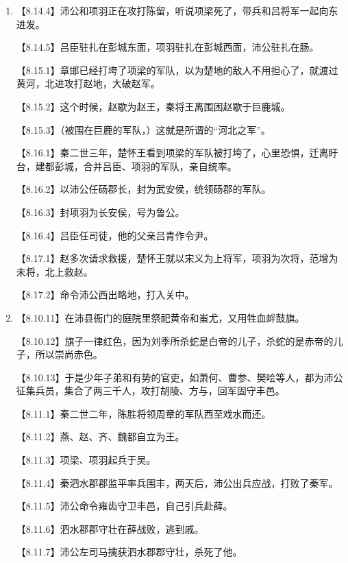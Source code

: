 \documentclass[fontset=none,11pt,a4paper]{ctexart}
\begin{document}
\begin{enumerate}[label=\Alph*.]
  \item
\noindent 【8.14.4】沛公和项羽正在攻打陈留，听说项梁死了，带兵和吕将军一起向东进发。\par
\noindent 【8.14.5】吕臣驻扎在彭城东面，项羽驻扎在彭城西面，沛公驻扎在肠。\par
\noindent 【8.15.1】章邯已经打垮了项梁的军队，以为楚地的敌人不用担心了，就渡过黄河，北进攻打赵地，大破赵军。\par
\noindent 【8.15.2】这个时候，赵歇为赵王，秦将王离围困赵歇于巨鹿城。\par
\noindent 【8.15.3】（被围在巨鹿的军队，）这就是所谓的“河北之军”。\par
\noindent 【8.16.1】秦二世三年，楚怀王看到项梁的军队被打垮了，心里恐惧，迁离盱台，建都彭城，合并吕臣、项羽的军队，亲自统率。\par
\noindent 【8.16.2】以沛公任砀郡长，封为武安侯，统领砀郡的军队。\par
\noindent 【8.16.3】封项羽为长安侯，号为鲁公。\par
\noindent 【8.16.4】吕臣任司徒，他的父亲吕青作令尹。\par
\noindent 【8.17.1】赵多次请求救援，楚怀王就以宋义为上将军，项羽为次将，范增为未将，北上救赵。\par
\noindent 【8.17.2】命令沛公西出略地，打入关中。\par
  \item
\noindent 【8.10.11】在沛县衙门的庭院里祭祀黄帝和蚩尤，又用牲血衅鼓旗。\par
\noindent 【8.10.12】旗子一律红色，因为刘季所杀蛇是白帝的儿子，杀蛇的是赤帝的儿子，所以崇尚赤色。\par
\noindent 【8.10.13】于是少年子弟和有势的官吏，如萧何、曹参、樊哙等人，都为沛公征集兵员，集合了两三千人，攻打胡陵、方与，回军固守丰邑。\par
\noindent 【8.11.1】秦二世二年，陈胜将领周章的军队西至戏水而还。\par
\noindent 【8.11.2】燕、赵、齐、魏都自立为王。\par
\noindent 【8.11.3】项梁、项羽起兵于吴。\par
\noindent 【8.11.4】秦泗水郡郡监平率兵围丰，两天后，沛公出兵应战，打败了秦军。\par
\noindent 【8.11.5】沛公命令雍齿守卫丰邑，自己引兵赴薛。\par
\noindent 【8.11.6】泗水郡郡守壮在薛战败，逃到戚。\par
\noindent 【8.11.7】沛公左司马擒获泗水郡郡守壮，杀死了他。\par

\end{enumerate}
\end{document}
